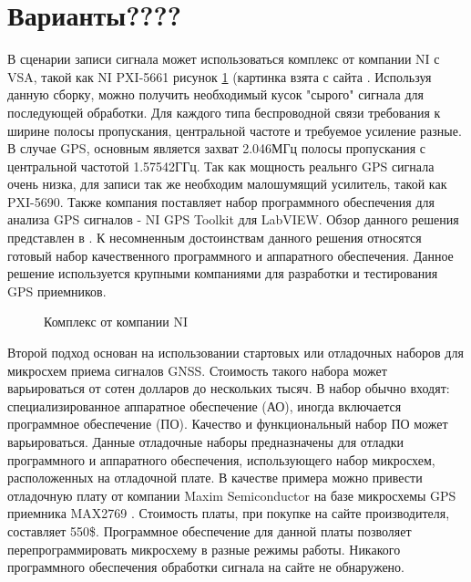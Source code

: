 \documentclass[a4paper,12pt]{article}
\numberwithin{table}{section}
\begin{document}
\section{Варианты????}
В сценарии записи сигнала может использоваться комплекс от компании NI с VSA, такой как NI PXI-5661 рисунок \ref{pic:ni5661}
(картинка взята с сайта \cite{ni5661}.
Используя данную сборку, можно получить необходимый кусок "сырого" сигнала для последующей обработки.
Для каждого типа беспроводной связи требования к ширине полосы пропускания, центральной частоте и требуемое усиление разные. В
случае GPS, основным является захват 2.046МГц полосы пропускания с центральной частотой 1.57542ГГц.
Так как мощность реальнго GPS сигнала очень низка, для записи так же необходим малошумящий усилитель, такой как PXI-5690.
Также компания поставляет набор программного обеспечения для анализа  GPS сигналов - NI GPS Toolkit для LabVIEW.
Обзор данного решения представлен в \cite{ni5661, ni-vsa}.
К несомненным достоинствам данного решения относятся готовый набор качественного программного и аппаратного обеспечения.
Данное решение используется крупными компаниями для разработки и тестирования GPS приемников.
 
\begin{figure}[h]
\begin{center}
\end{center}
\caption{Комплекс от компании NI}
\label{pic:ni5661}
\end{figure}

Второй подход основан на использовании стартовых или отладочных наборов для микросхем приема сигналов GNSS.
Стоимость такого набора может варьироваться от сотен долларов до нескольких тысяч.
В набор обычно входят: специализированное аппаратное обеспечение (АО), иногда включается программное обеспечение (ПО).
Качество и функциональный набор ПО может варьироваться.
Данные отладочные наборы предназначены для отладки программного и аппаратного обеспечения, использующего набор
микросхем, расположенных на отладочной плате.
В качестве примера можно привести отладочную плату от компании Maxim Semiconductor на базе микросхемы GPS приемника MAX2769 \cite{max-evkit}.
Стоимость платы, при покупке на сайте производителя, составляет 550\$.
Программное обеспечение для данной платы позволяет перепрограммировать микросхему в разные режимы работы.
Никакого программного обеспечения обработки сигнала на сайте не обнаружено.
\end{document}
